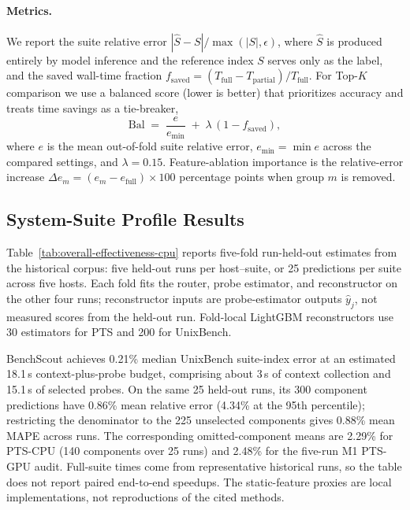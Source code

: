 \documentclass[sigconf, review, anonymous, balance=false]{acmart}
\begin{document}
\paragraph{Metrics.}
\label{subsubsec:metrics}
We report the suite relative error $|\hat{S}-S|/\max(|S|,\epsilon)$, where $\hat{S}$ is produced entirely by model inference and the reference index $S$ serves only as the label, and the saved wall-time fraction $f_{\mathrm{saved}}=(T_{\mathrm{full}}-T_{\mathrm{partial}})/T_{\mathrm{full}}$.
For Top-$K$ comparison we use a balanced score (lower is better) that prioritizes accuracy and treats time savings as a tie-breaker,
\begin{equation}
\label{eq:balanced-score}
\mathrm{Bal} \;=\; \frac{e}{e_{\min}} \;+\; \lambda \,(1 - f_{\mathrm{saved}}),
\end{equation}
where $e$ is the mean out-of-fold suite relative error, $e_{\min}=\min e$ across the compared settings, and $\lambda = 0.15$.
Feature-ablation importance is the relative-error increase $\Delta e_m=(e_m-e_{\mathrm{full}})\times 100$ percentage points when group $m$ is removed.

\subsection{System-Suite Profile Results}
\label{subsec:overall-effectiveness}

Table~\ref{tab:overall-effectiveness-cpu} reports five-fold run-held-out estimates from the historical corpus: five held-out runs per host--suite, or 25 predictions per suite across five hosts. Each fold fits the router, probe estimator, and reconstructor on the other four runs; reconstructor inputs are probe-estimator outputs $\hat{y}_j$, not measured scores from the held-out run. Fold-local LightGBM reconstructors use 30 estimators for PTS and 200 for UnixBench.

BenchScout achieves 0.21\% median UnixBench suite-index error at an estimated 18.1\,s context-plus-probe budget, comprising about 3\,s of context collection and 15.1\,s of selected probes. On the same 25 held-out runs, its 300 component predictions have 0.86\% mean relative error (4.34\% at the 95th percentile); restricting the denominator to the 225 unselected components gives 0.88\% mean MAPE across runs. The corresponding omitted-component means are 2.29\% for PTS-CPU (140 components over 25 runs) and 2.48\% for the five-run M1 PTS-GPU audit. Full-suite times come from representative historical runs, so the table does not report paired end-to-end speedups. The static-feature proxies are local implementations, not reproductions of the cited methods.
\end{document}
